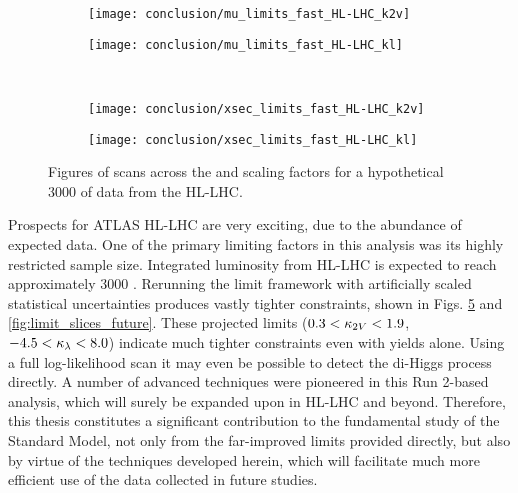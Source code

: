 \begin{figure}
    \centering
    \begin{subfigure}{0.48\textwidth} 
        \texttt{[image: conclusion/mu\_limits\_fast\_HL-LHC\_k2v]}
        \caption{}%
        \label{fig:mulimits_kvv_future}
    \end{subfigure}
    \begin{subfigure}{0.48\textwidth}
        \texttt{[image: conclusion/mu\_limits\_fast\_HL-LHC\_kl]}
        \caption{}%
        \label{fig:mulimits_kl_future}
    \end{subfigure}\\
    \begin{subfigure}{0.48\textwidth} 
        \texttt{[image: conclusion/xsec\_limits\_fast\_HL-LHC\_k2v]}
        \caption{}%
        \label{fig:xseclimits_kvv_future}
    \end{subfigure}
    \begin{subfigure}{0.48\textwidth}
        \texttt{[image: conclusion/xsec\_limits\_fast\_HL-LHC\_kl]}
        \caption{}%
        \label{fig:xseclimits_kl_future}
    \end{subfigure}
    \caption{
        Figures of scans across the \kvv and \kl scaling factors
            for a hypothetical 3000 \ifb of data from the HL-LHC.
    }
    \label{fig:mu_xsec_future}
\end{figure}

Prospects for ATLAS HL-LHC are very exciting, due to the abundance of expected data.
One of the primary limiting factors in this analysis was its highly restricted sample size.
Integrated luminosity from HL-LHC is expected to reach approximately 3000 \ifb.
Rerunning the limit framework with artificially scaled statistical uncertainties produces vastly tighter constraints,
    shown in Figs. \ref{fig:mu_xsec_future} and \ref{fig:limit_slices_future}.
These projected limits 
    ($0.3<\kappa_{2V}<1.9$, $-4.5<\kappa_{\lambda}<8.0$)
    indicate much tighter constraints even with yields alone.
Using a full log-likelihood scan it may even be possible to detect the di-Higgs process directly.
A number of advanced techniques were pioneered in this Run 2-based analysis,
    which will surely be expanded upon in HL-LHC and beyond.
Therefore, this thesis constitutes a significant contribution to the fundamental study of the Standard Model,
    not only from the far-improved limits provided directly,
    but also by virtue of the techniques developed herein,
    which will facilitate much more efficient use of the data collected in future studies.


